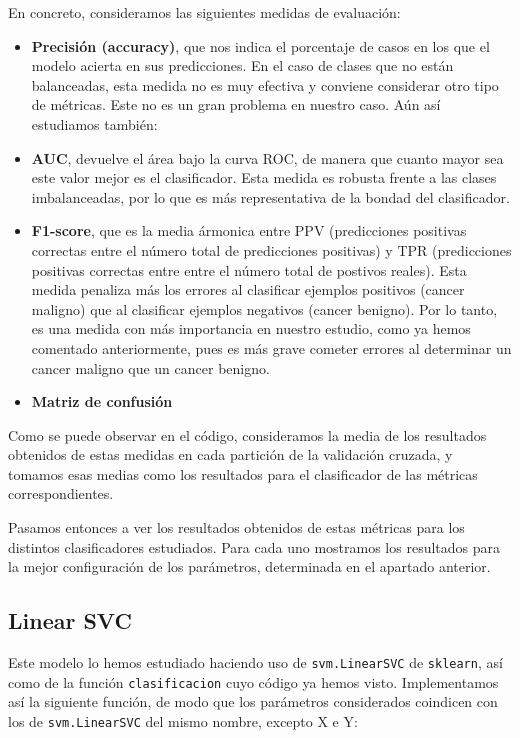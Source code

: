 \documentclass[a4paper,11pt]{article}
\begin{document}
En concreto, consideramos las siguientes medidas de evaluación:
\begin{itemize}
	\item \textbf{Precisión (accuracy)}, que nos indica el porcentaje de casos en los que el modelo acierta en sus predicciones. En el caso de clases que no están balanceadas, esta medida no es muy efectiva y conviene considerar otro tipo de métricas. Este no es un gran problema en nuestro caso. Aún así estudiamos también:
	\item \textbf{AUC}, devuelve el área bajo la curva ROC, de manera que cuanto mayor sea este valor mejor es el clasificador. Esta medida es robusta frente a las clases imbalanceadas, por lo que es más representativa de la bondad del clasificador.
	\item \textbf{F1-score}, que es la media ármonica entre PPV (predicciones positivas correctas entre el número total de predicciones positivas) y TPR (predicciones positivas correctas entre entre el número total de postivos reales). Esta medida penaliza más los errores al clasificar ejemplos positivos (cancer maligno) que al clasificar ejemplos negativos (cancer benigno). Por lo tanto, es una medida con más importancia en nuestro estudio, como ya hemos comentado anteriormente, pues es más grave cometer errores al determinar un cancer maligno que un cancer benigno.
	\item \textbf{Matriz de confusión}
\end{itemize}

Como se puede observar en el código, consideramos la media de los resultados obtenidos de estas medidas en cada partición de la validación cruzada, y tomamos esas medias como los resultados para el clasificador de las métricas correspondientes. 

Pasamos entonces a ver los resultados obtenidos de estas métricas para los distintos clasificadores estudiados. Para cada uno mostramos los resultados para la mejor configuración de los parámetros, determinada en el apartado anterior. 
\subsection{Linear SVC}

Este modelo lo hemos estudiado haciendo uso de \texttt{svm.LinearSVC} de \texttt{sklearn}, así como de la función \texttt{clasificacion} cuyo código ya hemos visto. Implementamos así la siguiente función, de modo que los parámetros considerados coindicen con los de \texttt{svm.LinearSVC} del mismo nombre, excepto X e Y:
\end{document}
